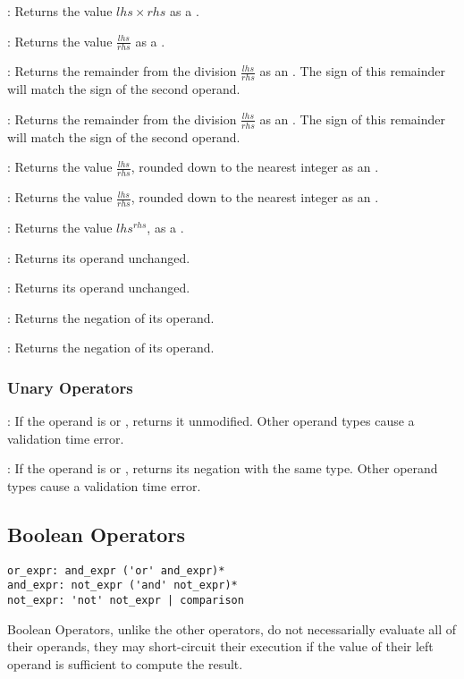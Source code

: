 : Returns the value $lhs \times rhs$ as a .

: Returns the value $\frac{lhs}{rhs}$ as a .

: Returns the remainder from the division $\frac{lhs}{rhs}$ as
an . The sign of this remainder will match the sign of the second
operand.

: Returns the remainder from the division $\frac{lhs}{rhs}$
as an . The sign of this remainder will match the sign of the second
operand.

: Returns the value $\frac{lhs}{rhs}$, rounded down to the
nearest integer as an .

: Returns the value $\frac{lhs}{rhs}$, rounded down to the
nearest integer as an .

: Returns the value $lhs^{rhs}$, as a .

: Returns its operand unchanged.

: Returns its operand unchanged.

: Returns the negation of its operand.

: Returns the negation of its operand.

\subsubsection{Unary Operators}

\code{+}: If the operand is  or , returns it unmodified.
Other operand types cause a validation time error.

\code{-}: If the operand is  or , returns its negation with
the same type. Other operand types cause a validation time error.

\subsection{Boolean Operators}

\begin{lstlisting}
or_expr: and_expr ('or' and_expr)*
and_expr: not_expr ('and' not_expr)*
not_expr: 'not' not_expr | comparison
\end{lstlisting}

Boolean Operators, unlike the other operators, do not necessarially evaluate
all of their operands, they may short-circuit their execution if the value of
their left operand is sufficient to compute the result.


